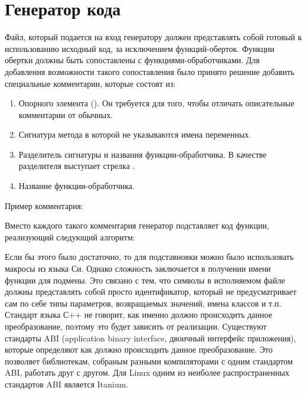 \section{Генератор кода}

Файл, который подается на вход генератору должен представлять собой готовый к
использованию исходный код, за исключением функций-оберток. Функции обертки
должны быть сопоставлены с функциями-обработчиками. Для добавления возможности
такого сопоставления было принято решение добавить специальные комментарии,
которые состоят из:

\begin{enumerate}
	\item Опорного элемента (). Он требуется для того, чтобы
		отличать описательные комментарии от обычных.
	\item Сигнатура метода в которой не указываются имена переменных.
	\item Разделитель сигнатуры и названия функции-обработчика. В качестве
		разделителя выступает стрелка \code{->}.
	\item Название функции-обработчика.
\end{enumerate}

Пример комментария: 

Вместо каждого такого комментария генератор подставляет код функции, реализующий
следующий алгоритм:

\begin{algorithm}[H]
\end{algorithm}

Если бы этого было достаточно, то для подставновки можно было использовать
макросы из языка Си. Однако сложность заключается в получении имени функции для
подмены. Это связано с тем, что символы в исполняемом файле должны представлять
собой просто идентификатор, который не предусматривает сам по себе типы
параметров, возвращаемых значений, имена классов и т.п.
Стандарт языка С++ не говорит, как именно должно происходить данное
преобразование, поэтому это будет зависить от реализации. Существуют стандарты
ABI (application binary interface, двоичный интерфейс приложения), которые
определяют как должно происходить данное преобразование. Это позволяет
библиотекам, собраным разными компиляторами с одним стандартом ABI, работать
друг с другом. Для Linux одним из неиболее распространенных стандартов ABI
является Itanium\cite{itaniumabi}.

